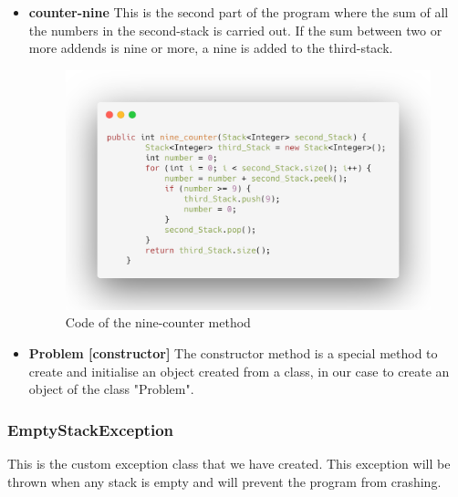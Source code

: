 \documentclass[a4paper]{article}
\theoremstyle{plain}
\theoremstyle{definition}
\begin{document}
\begin{itemize}
\newpage
                \item \textbf{counter-nine}
                This is the second part of the program where the sum of all the numbers in the second-stack is carried out. If the sum between two or more addends is nine or more, a nine is added to the third-stack.
                \begin{figure}[h]
                     \centering
                     \includegraphics[width=300pt\textwidth]{counter-nine.png}
                     \caption{Code of the nine-counter method}
                     \label{fig:mesh1}
                \end{figure}

                \item \textbf{Problem [constructor]}
                The constructor method is a special method to create and initialise an object created from a class, in our case to create an object of the class "Problem".

            \end{itemize}
        \subsubsection{EmptyStackException}
        This is the custom exception class that we have created. This exception will be thrown when any stack is empty and will prevent the program from crashing.
\end{document}
